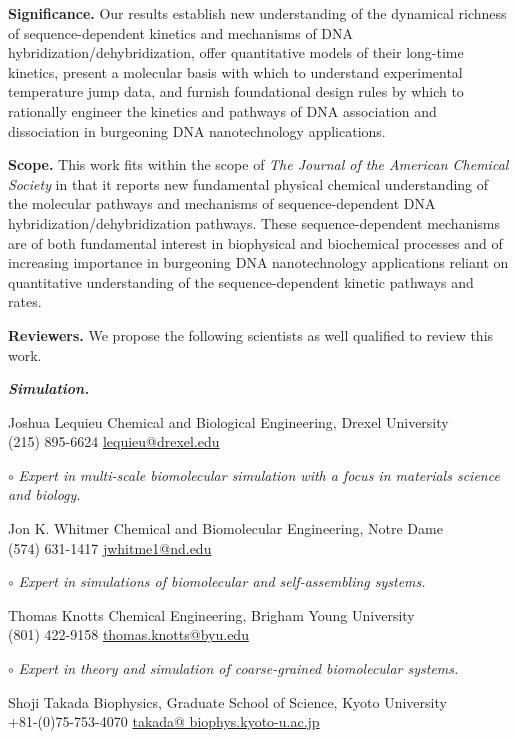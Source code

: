 \documentclass[11pt,a4paper]{letter} %
\begin{document}
\begin{letter}
\textbf{Significance.} Our results establish new understanding of the dynamical richness of sequence-dependent kinetics and mechanisms of DNA hybridization/dehybridization, offer quantitative models of their long-time kinetics, present a molecular basis with which to understand experimental temperature jump data, and furnish foundational design rules by which to rationally engineer the kinetics and pathways of DNA association and dissociation in burgeoning DNA nanotechnology applications.

\textbf{Scope.}  This work fits within the scope of \textit{The Journal of the American Chemical Society} in that it reports new fundamental physical chemical understanding of the molecular pathways and mechanisms of sequence-dependent DNA hybridization/dehybridization pathways. These sequence-dependent mechanisms are of both fundamental interest in biophysical and biochemical processes and of increasing importance in burgeoning DNA nanotechnology applications reliant on quantitative understanding of the sequence-dependent kinetic pathways and rates.


\textbf{Reviewers.} We propose the following scientists as well qualified to review this work.

\textbf{\textit{Simulation.}}

Joshua Lequieu \hfill Chemical and Biological Engineering, Drexel University \\
(215) 895-6624 \hfill \url{lequieu@drexel.edu}

$\circ$ \textit{Expert in multi-scale biomolecular simulation with a focus in materials science and biology.}

Jon K. Whitmer \hfill Chemical and Biomolecular Engineering, Notre Dame \\
(574) 631-1417 \hfill \url{jwhitme1@nd.edu}

$\circ$ \textit{Expert in simulations of biomolecular and self-assembling systems.}

Thomas Knotts \hfill Chemical Engineering, Brigham Young University \\
(801) 422-9158 \hfill \url{thomas.knotts@byu.edu}

$\circ$ \textit{Expert in theory and simulation of coarse-grained biomolecular systems.}

Shoji Takada \hfill Biophysics, Graduate School of Science, Kyoto University \\
+81-(0)75-753-4070 \hfill \url{takada@ biophys.kyoto-u.ac.jp}


\end{letter}
\end{document}
